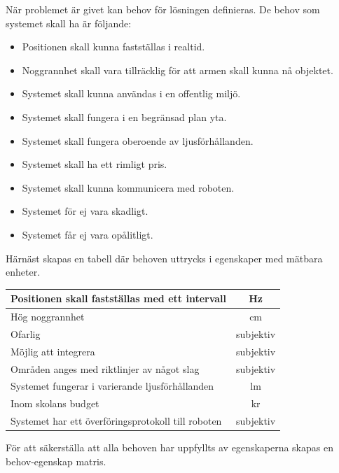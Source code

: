 \documentclass[11pt, a4paper]{report}
\begin{document}
När problemet är givet kan behov för lösningen definieras. De behov som systemet skall ha är följande:

\begin{itemize}
	\item Positionen skall kunna fastställas i realtid.
	\item Noggrannhet skall vara tillräcklig för att armen skall kunna nå objektet.
	\item Systemet skall kunna användas i en offentlig miljö.
	\item Systemet skall fungera i en begränsad plan yta.
	\item Systemet skall fungera oberoende av ljusförhållanden.
	\item Systemet skall ha ett rimligt pris.
	\item Systemet skall kunna kommunicera med roboten.
	\item Systemet för ej vara skadligt.
	\item Systemet får ej vara opålitligt.
\end{itemize}

Härnäst skapas en tabell där behoven uttrycks i egenskaper med mätbara enheter.\\

\begin{center}
     \begin{tabular}{l | c}
  		Positionen skall fastställas med ett intervall & Hz \\ \hline
        Hög noggrannhet & cm\\ \hline
        Ofarlig & subjektiv\\ \hline
        Möjlig att integrera & subjektiv\\ \hline
        Områden anges med riktlinjer av något slag & subjektiv \\ \hline
        Systemet fungerar i varierande ljusförhållanden & lm \\ \hline
        Inom skolans budget & kr \\ \hline
        Systemet har ett överföringsprotokoll till roboten & subjektiv
  \end{tabular}
\end{center}
\cleardoublepage
För att säkerställa att alla behoven har uppfyllts av egenskaperna skapas en behov-egenskap matris.
\end{document}
